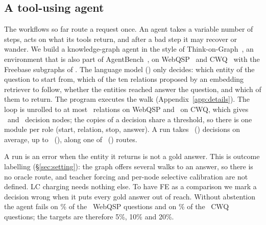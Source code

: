 \subsection{A tool-using agent}\label{sec:exp-agent}

The workflows so far route a request once. An agent takes a variable number of steps, acts
on what its tools return, and after a bad step it may recover or wander. We build a
knowledge-graph agent in the style of Think-on-Graph~\citep{sun2024tog}, an environment that
is also part of AgentBench~\citep{liu2024agentbench}, on WebQSP~\citep{yih2016webqsp} and
CWQ~\citep{talmor2018cwq} with the Freebase subgraphs of \citet{luo2024rog}. The language
model (\texttt{\AgentModel}) only decides: which entity of the question to start from, which
of the ten relations proposed by an embedding retriever to follow, whether the entities
reached answer the question, and which of them to return. The program executes the walk
(Appendix~\ref{app:details}). The loop is unrolled to at most \AgentBudgetW\ relations on
WebQSP and \AgentBudgetQ\ on CWQ, which gives \AgentNodesW\ and \AgentNodesQ\ decision nodes;
the copies of a decision share a threshold, so there is one module per role (start, relation,
stop, answer). A run takes \AgentDecisionsW\ (\AgentDecisionsQ) decisions on average, up to
\AgentDecisionsMaxW\ (\AgentDecisionsMaxQ), along one of \AgentRoutesW\ (\AgentRoutesQ)
routes.

A run is an error when the entity it returns is not a gold answer. This is outcome
labelling (\S\ref{sec:setting}): the graph offers several walks to an answer, so there is no
oracle route, and teacher forcing and per-node selective calibration are not defined. LC
charging needs nothing else. To have FE as a comparison we mark a decision wrong when it
puts every gold answer out of reach. Without abstention the agent fails on \AgentErrW\% of
the \AgentSizeW\ WebQSP questions and on \AgentErrQ\% of the \AgentSizeQ\ CWQ questions; the
targets are therefore 5\%, 10\% and 20\%.

\begin{table}[t]
\centering\footnotesize
\setlength{\tabcolsep}{3.5pt}

\caption{The knowledge-graph agent on WebQSP (\AgentNodesW\ decisions, four roles),
$n=4{,}000$, $\delta=0.1$, \AgentTrials\ draws, grid with the extended tail. Columns as in
Table~\ref{tab:main}.}\label{tab:agent}
\end{table}

